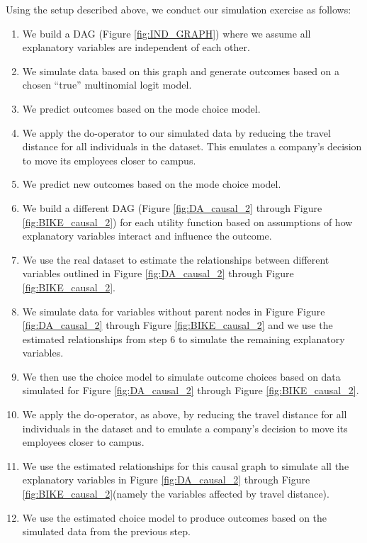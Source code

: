 Using the setup described above, we conduct our simulation exercise as follows:
\begin{enumerate}

\item We build a DAG (Figure \ref{fig:IND_GRAPH}) where we assume all explanatory variables are independent of each other.
\item We simulate data based on this graph and generate outcomes based on a chosen ``true'' multinomial logit model.
\item We predict outcomes based on the mode choice model.
\item We apply the do-operator \citet{pearl_causality_2000} to our simulated data by reducing the travel distance for all individuals in the dataset. This emulates a company's decision to move its employees closer to campus.
\item We predict new outcomes based on the mode choice model.\newline
\item We build a different DAG (Figure \ref{fig:DA_causal_2} through Figure \ref{fig:BIKE_causal_2}) for each utility function based on assumptions of how explanatory variables interact and influence the outcome.
\item We use the real dataset to estimate the relationships between different variables outlined in Figure \ref{fig:DA_causal_2} through Figure \ref{fig:BIKE_causal_2}.
\item We simulate data for variables without parent nodes in Figure Figure \ref{fig:DA_causal_2} through Figure \ref{fig:BIKE_causal_2} and we use the estimated relationships from step 6 to simulate the remaining explanatory variables.
\item We then use the choice model to simulate outcome choices based on data simulated for Figure \ref{fig:DA_causal_2} through Figure \ref{fig:BIKE_causal_2}.
\item We apply the do-operator, as above, by reducing the travel distance for all individuals in the dataset and to emulate a company's decision to move its employees closer to campus.
\item We use the estimated relationships for this causal graph to simulate all the explanatory variables in Figure \ref{fig:DA_causal_2} through Figure \ref{fig:BIKE_causal_2}(namely the variables affected by travel distance).
\item We use the estimated choice model to produce outcomes based on the simulated data from the previous step.

\end{enumerate}

